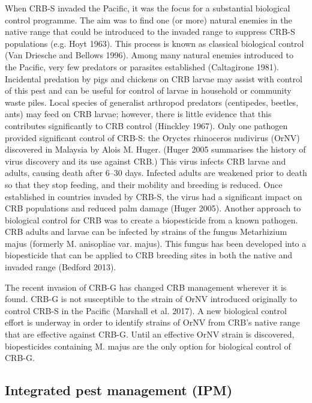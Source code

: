 \documentclass[twocolumn,letterpaper]{scrartcl}
\begin{document}
When  CRB-S  invaded  the  Pacific,  it  was  the  focus  for  a  substantial  biological  control  programme.  The  aim 
was to find one (or more) natural enemies in the native range that could be introduced to the invaded range 
to  suppress  CRB-S  populations  (e.g.  Hoyt  1963).  This  process  is  known  as  classical  biological  control  (Van 
Driesche and Bellows 1996). Among many natural enemies introduced to the Pacific, very few predators or 
parasites established (Caltagirone 1981). Incidental predation by pigs and chickens on CRB larvae may assist 
with control of this pest and can be useful for control of larvae in household or community waste piles. Local 
species of generalist arthropod predators (centipedes, beetles, ants) may feed on CRB larvae; however, there is 
little evidence that this contributes significantly to CRB control (Hinckley 1967). Only one pathogen provided 
significant control of CRB-S: the Oryctes rhinoceros nudivirus (OrNV) discovered in Malaysia by Alois M. Huger. 
(Huger 2005 summarises the history of virus discovery and its use against CRB.) This virus infects CRB larvae and 
adults, causing death after 6–30 days. Infected adults are weakened prior to death so that they stop feeding, 
and their mobility and breeding is reduced. Once established in countries invaded by CRB-S, the virus had a 
significant impact on CRB populations and reduced palm damage (Huger 2005). Another approach to biological 
control for CRB was to create a biopesticide from a known pathogen. CRB adults and larvae can be infected by 
strains of the fungus Metarhizium majus (formerly M. anisopliae var. majus). This fungus has been developed into 
a biopesticide that can be applied to CRB breeding sites in both the native and invaded range (Bedford 2013). 

The recent invasion of CRB-G has changed CRB management wherever it is found. CRB-G is not susceptible to 
the strain of OrNV introduced originally to control CRB-S in the Pacific (Marshall et al. 2017). A new biological 
control effort is underway in order to identify strains of OrNV from CRB’s native range that are effective against 
CRB-G. Until an effective OrNV strain is discovered, biopesticides containing M. majus are the only option for 
biological control of CRB-G. 

\subsection{Integrated pest management (IPM)}
\end{document}

